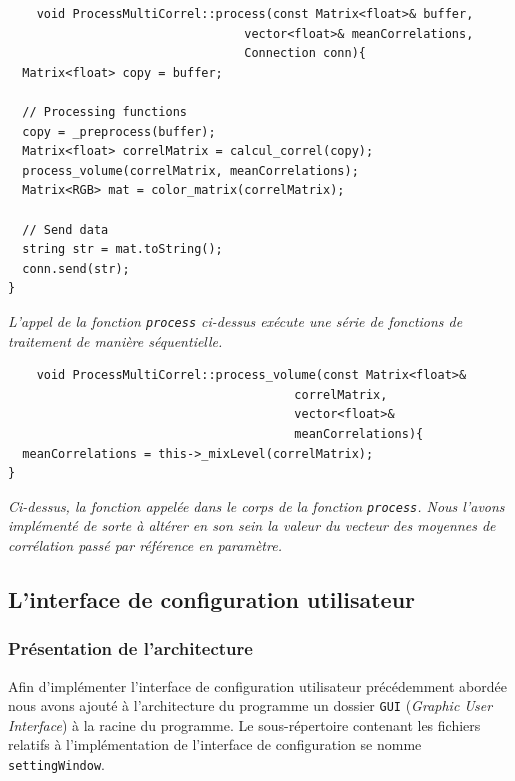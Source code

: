  \begin{lstlisting}
    void ProcessMultiCorrel::process(const Matrix<float>& buffer,
                                 vector<float>& meanCorrelations,
                                 Connection conn){
  Matrix<float> copy = buffer;

  // Processing functions
  copy = _preprocess(buffer);
  Matrix<float> correlMatrix = calcul_correl(copy);
  process_volume(correlMatrix, meanCorrelations);
  Matrix<RGB> mat = color_matrix(correlMatrix);

  // Send data
  string str = mat.toString();
  conn.send(str);
}
 \end{lstlisting}
 \begin{center}
  \textit{L'appel de la fonction \verb!process! ci-dessus exécute une série de fonctions de traitement de manière séquentielle.}
 \end{center}

 \begin{lstlisting}
    void ProcessMultiCorrel::process_volume(const Matrix<float>&
                                        correlMatrix,
                                        vector<float>&
                                        meanCorrelations){
  meanCorrelations = this->_mixLevel(correlMatrix);
}
 \end{lstlisting}
 \begin{center}
  \textit{Ci-dessus, la fonction appelée dans le corps de la fonction \verb!process!. Nous l'avons implémenté de sorte à altérer en son sein la valeur du vecteur des moyennes de corrélation passé par référence en paramètre.}
 \end{center}

 \subsection{L'interface de configuration utilisateur}
 \paragraph{}

 \subsubsection{Présentation de l'architecture}
 Afin d'implémenter l'interface de configuration utilisateur précédemment abordée
 nous avons ajouté à l'architecture du programme un dossier
 \verb!GUI! (\textit{Graphic User Interface}) à la racine du programme.
 Le sous-répertoire contenant les fichiers relatifs à l'implémentation de
 l'interface de configuration se nomme \verb!settingWindow!.

